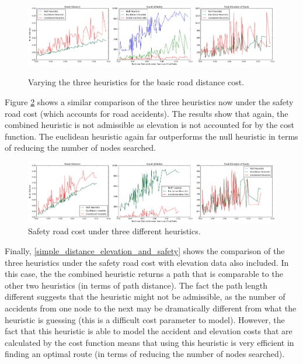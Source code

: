 \documentclass[11pt]{article}
\begin{document}
\begin{figure}[H]
\caption{Varying the three heuristics for the basic road distance cost.}
\includegraphics[width=1\textwidth]{../images/simple_distance_cost}
\label{simple_distance_cost}
\end{figure}

Figure \ref{simple_distance_and_safety} shows a similar comparison of the three heuristics now under the safety road cost (which accounts for road accidents). The results show that again, the combined heuristic is not admissible as elevation is not accounted for by the cost function. The euclidean heuristic again far outperforms the null heuristic in terms of reducing the number of nodes searched.

\begin{figure}[H]
\includegraphics[width=1\textwidth]{../images/simple_distance_and_elevation}
\caption{Safety road cost under three different heuristics.}
\label{simple_distance_and_safety}
\end{figure}

Finally, \ref{simple_distance_elevation_and_safety} shows the comparison of the three heuristics under the safety road cost with elevation data also included. In this case, the the combined heuristic returns a path that is comparable to the other two heuristics (in terms of path distance). The fact the path length different suggests that the heuristic might not be admissible, as the number of accidents from one node to the next may be dramatically different from what the heuristic is guessing (this is a difficult cost parameter to model). However, the fact that this heuristic is able to model the accident and elevation costs that are calculated by the cost function means that using this heuristic is very efficient in finding an optimal route (in terms of reducing the number of nodes searched).
\end{document}
